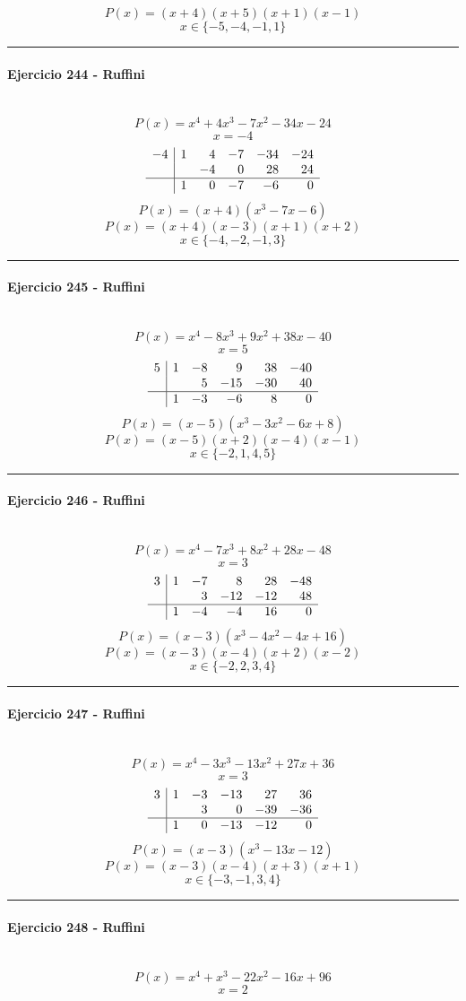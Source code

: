 \documentclass[10pt,a4paper]{article}
\newcommand{\res}[1]{\paragraph{#1}\mbox{}\\[-1.2em]}
\begin{document}
\[ P(x)=(x+4)(x+5)(x+1)(x-1) \]
\[ \boxed{x\in\{-5,-4,-1,1\}} \]
\vspace{1mm}\hrule\vspace{2mm}
\res{Ejercicio 244 - Ruffini}
\[ P(x)=x^{4} + 4 x^{3} - 7 x^{2} - 34 x - 24 \]
\[ x=-4 \]
\[\begin{array}{r|rrrrr}-4 & 1 & 4 & -7 & -34 & -24\\  &  & -4 & 0 & 28 & 24\\\hline  & 1 & 0 & -7 & -6 & 0\end{array}\]
\[ P(x)=(x+4)(x^{3} - 7 x - 6) \]
\[ P(x)=(x+4)(x-3)(x+1)(x+2) \]
\[ \boxed{x\in\{-4,-2,-1,3\}} \]
\vspace{1mm}\hrule\vspace{2mm}
\res{Ejercicio 245 - Ruffini}
\[ P(x)=x^{4} - 8 x^{3} + 9 x^{2} + 38 x - 40 \]
\[ x=5 \]
\[\begin{array}{r|rrrrr}5 & 1 & -8 & 9 & 38 & -40\\  &  & 5 & -15 & -30 & 40\\\hline  & 1 & -3 & -6 & 8 & 0\end{array}\]
\[ P(x)=(x-5)(x^{3} - 3 x^{2} - 6 x + 8) \]
\[ P(x)=(x-5)(x+2)(x-4)(x-1) \]
\[ \boxed{x\in\{-2,1,4,5\}} \]
\vspace{1mm}\hrule\vspace{2mm}
\res{Ejercicio 246 - Ruffini}
\[ P(x)=x^{4} - 7 x^{3} + 8 x^{2} + 28 x - 48 \]
\[ x=3 \]
\[\begin{array}{r|rrrrr}3 & 1 & -7 & 8 & 28 & -48\\  &  & 3 & -12 & -12 & 48\\\hline  & 1 & -4 & -4 & 16 & 0\end{array}\]
\[ P(x)=(x-3)(x^{3} - 4 x^{2} - 4 x + 16) \]
\[ P(x)=(x-3)(x-4)(x+2)(x-2) \]
\[ \boxed{x\in\{-2,2,3,4\}} \]
\vspace{1mm}\hrule\vspace{2mm}
\res{Ejercicio 247 - Ruffini}
\[ P(x)=x^{4} - 3 x^{3} - 13 x^{2} + 27 x + 36 \]
\[ x=3 \]
\[\begin{array}{r|rrrrr}3 & 1 & -3 & -13 & 27 & 36\\  &  & 3 & 0 & -39 & -36\\\hline  & 1 & 0 & -13 & -12 & 0\end{array}\]
\[ P(x)=(x-3)(x^{3} - 13 x - 12) \]
\[ P(x)=(x-3)(x-4)(x+3)(x+1) \]
\[ \boxed{x\in\{-3,-1,3,4\}} \]
\vspace{1mm}\hrule\vspace{2mm}
\res{Ejercicio 248 - Ruffini}
\[ P(x)=x^{4} + x^{3} - 22 x^{2} - 16 x + 96 \]
\[ x=2 \]
\end{document}

